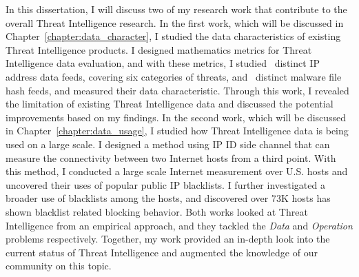 \begin{dissertationintroduction}
In this dissertation, I will discuss two of my research work 
that contribute to the overall Threat Intelligence research. In the first
work, which will be discussed in Chapter~\ref{chapter:data_character}, 
I studied the data characteristics of existing Threat Intelligence products.
I designed mathematics metrics for Threat Intelligence data evaluation,
and with these metrics, I studied \numipfeeds\ distinct IP address 
data feeds, covering six categories of threats, and \numhashfeeds\ distinct
malware file hash feeds, and measured their data characteristic. Through this
work, I revealed the limitation of existing Threat Intelligence data and 
discussed the potential improvements based on my findings. In the second
work, which will be discussed in Chapter~\ref{chapter:data_usage}, I 
studied how Threat Intelligence data is being used on a large scale. 
I designed a method using IP ID side channel that can measure the 
connectivity between two Internet hosts from a third point. With this 
method, I conducted a large scale Internet measurement over {} 
U.S. hosts and uncovered their uses of {\blacklistnum} popular public IP
blacklists. I further investigated a broader use of blacklists among the 
hosts, and discovered over 73K hosts has shown blacklist related blocking 
behavior. Both works looked at Threat Intelligence from an empirical
approach, and they tackled the \textit{Data} and \textit{Operation} problems
respectively. Together, my work provided an in-depth look into the current
status of Threat Intelligence and augmented the knowledge of our community
on this topic.

\end{dissertationintroduction}
